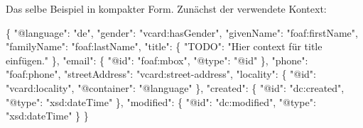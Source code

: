 \documentclass[,a4paper]{article}
\newenvironment{Shaded}{}{}
\newcommand{\DataTypeTok}[1]{\textcolor[rgb]{0.56,0.13,0.00}{{#1}}}
\newcommand{\StringTok}[1]{\textcolor[rgb]{0.25,0.44,0.63}{{#1}}}
\newcommand{\FunctionTok}[1]{\textcolor[rgb]{0.02,0.16,0.49}{{#1}}}
\begin{document}
Das selbe Beispiel in kompakter Form. Zunächst der verwendete Kontext:

\begin{Shaded}
\begin{Highlighting}[]
\FunctionTok{\{}
    \DataTypeTok{"@language"}\FunctionTok{:} \StringTok{"de"}\FunctionTok{,}
    \DataTypeTok{"gender"}\FunctionTok{:} \StringTok{"vcard:hasGender"}\FunctionTok{,}
    \DataTypeTok{"givenName"}\FunctionTok{:} \StringTok{"foaf:firstName"}\FunctionTok{,}
    \DataTypeTok{"familyName"}\FunctionTok{:} \StringTok{"foaf:lastName"}\FunctionTok{,}
    \DataTypeTok{"title"}\FunctionTok{:} \FunctionTok{\{}
        \DataTypeTok{"TODO"}\FunctionTok{:} \StringTok{"Hier context für title einfügen."}
    \FunctionTok{\},}
    \DataTypeTok{"email"}\FunctionTok{:} \FunctionTok{\{}
        \DataTypeTok{"@id"}\FunctionTok{:} \StringTok{"foaf:mbox"}\FunctionTok{,}
        \DataTypeTok{"@type"}\FunctionTok{:} \StringTok{"@id"}
    \FunctionTok{\},}
    \DataTypeTok{"phone"}\FunctionTok{:} \StringTok{"foaf:phone"}\FunctionTok{,}
    \DataTypeTok{"streetAddress"}\FunctionTok{:} \StringTok{"vcard:street-address"}\FunctionTok{,}
    \DataTypeTok{"locality"}\FunctionTok{:} \FunctionTok{\{}
        \DataTypeTok{"@id"}\FunctionTok{:} \StringTok{"vcard:locality"}\FunctionTok{,}
        \DataTypeTok{"@container"}\FunctionTok{:} \StringTok{"@language"}
    \FunctionTok{\},}
    \DataTypeTok{"created"}\FunctionTok{:} \FunctionTok{\{}
        \DataTypeTok{"@id"}\FunctionTok{:} \StringTok{"dc:created"}\FunctionTok{,}
        \DataTypeTok{"@type"}\FunctionTok{:} \StringTok{"xsd:dateTime"}
    \FunctionTok{\},}
    \DataTypeTok{"modified"}\FunctionTok{:} \FunctionTok{\{}
        \DataTypeTok{"@id"}\FunctionTok{:} \StringTok{"dc:modified"}\FunctionTok{,}
        \DataTypeTok{"@type"}\FunctionTok{:} \StringTok{"xsd:dateTime"}
    \FunctionTok{\}}
\FunctionTok{\}}
\end{Highlighting}
\end{Shaded}
\end{document}
